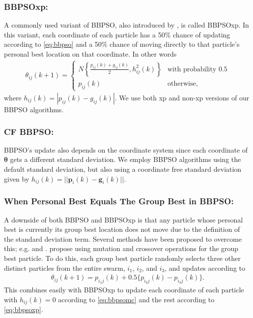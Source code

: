 \documentclass[cmbright]{staauth}
\numberwithin{table}{section}
\begin{document}
\subsubsection{BBPSOxp:}
A commonly used variant of BBPSO, also introduced by \cite{kennedy2003bare}, is called BBPSOxp. In this variant, each coordinate of each particle has a 50\% chance of updating according to \eqref{eq:bbpso} and a 50\% chance of moving directly to that particle's personal best location on that coordinate. In other words
\begin{align}\label{eq:bbpsoxp}
\theta_{ij}(k+1) = \begin{cases} N\left\{\frac{p_{ij}(k) + g_{ij}(k)}{2}, h^2_{ij}(k)\right\} & \mbox{with probability }0.5\\
p_{ij}(k) &\mbox{otherwise,}\end{cases}
\end{align}
where $h_{ij}(k) = |p_{ij}(k) - g_{ij}(k)|$. We use both xp and non-xp versions of our BBPSO algorithms.

\subsubsection{CF BBPSO:}
BBPSO's update also depends on the coordinate system since each coordinate of $\bm{\theta}$ gets a different standard deviation. We employ BBPSO algorithms using the default standard deviation, but also using a coordinate free standard deviation given by $h_{ij}(k) = ||\bm{p}_i(k) - \bm{g}_i(k)||$.

\subsubsection{When Personal Best Equals The Group Best in BBPSO:}
A downside of both BBPSO and BBPSOxp is that any particle whose personal best is currently its group best location does not move due to the definition of the standard deviation term. Several methods have been proposed to overcome this; e.g. \cite{hsieh2010modified} and \cite{zhang2011novel}. \cite{zhang2011novel} propose using mutation and crossover operations for the group best particle. To do this, each group best particle randomly selects three other distinct particles from the entire swarm, $i_1$, $i_2$, and $i_3$, and updates according to
\begin{align}\label{eq:bbpsomc}
\theta_{ij}(k+1) = p_{i_1j}(k) + 0.5\{p_{i_2j}(k) - p_{i_3j}(k)\}.
\end{align}
This combines easily with BBPSOxp to update each coordinate of each particle with $h_{ij}(k)=0$ according to \eqref{eq:bbpsomc} and the rest according to \eqref{eq:bbpsoxp}.
\end{document}
